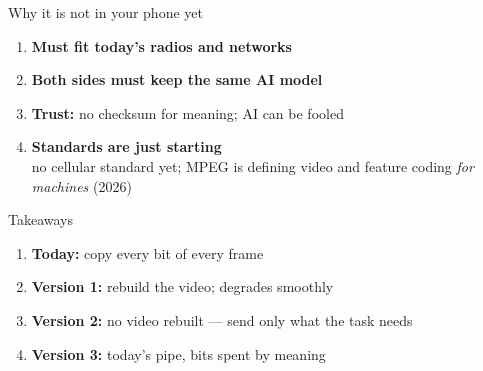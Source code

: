 \begin{frame}{Why it is not in your phone yet}
  \vspace{1.2em}
  \begin{enumerate}[<+->]\itemsep12pt
    \item \textbf{Must fit today's radios and networks}
    \item \textbf{Both sides must keep the same AI model}
    \item \textbf{Trust:} no checksum for meaning; AI can be fooled
    \item \textbf{Standards are just starting}\\
      {\small\textcolor{softgray}{no cellular standard yet; MPEG is defining video and
        feature coding \textit{for machines} (2026)}}
  \end{enumerate}

  \vspace{1.6em}
\end{frame}

\begin{frame}{Takeaways}
  \vspace{1.2em}
  \begin{enumerate}[<+->]\itemsep10pt
    \item \textbf{\textcolor{ranblue}{Today:}} copy every bit of every frame
    \item \textbf{\textcolor{ranpurple}{Version 1:}} rebuild the video;
      degrades smoothly
    \item \textbf{\textcolor{coreorange}{Version 2:}} no video rebuilt ---
      send only what the task needs
    \item \textbf{\textcolor{softgreen}{Version 3:}} today's pipe,
      bits spent by meaning
  \end{enumerate}

  \vspace{2.0em}
\end{frame}
